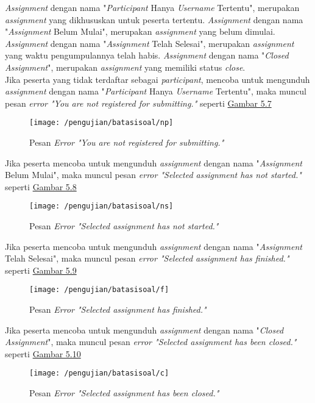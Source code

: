 	\textit{Assignment} dengan nama "\textit{Participant} Hanya \textit{Username} Tertentu", merupakan \textit{assignment} yang dikhususkan untuk peserta tertentu. \textit{Assignment} dengan nama "\textit{Assignment} Belum Mulai", merupakan \textit{assignment} yang belum dimulai. \textit{Assignment} dengan nama "\textit{Assignment} Telah Selesai", merupakan \textit{assignment} yang waktu pengumpulannya telah habis. \textit{Assignment} dengan nama "\textit{Closed Assignment}", merupakan \textit{assignment} yang memiliki status \textit{close}. \\
	
	Jika peserta yang tidak terdaftar sebagai \textit{participant}, mencoba untuk mengunduh \textit{assignment} dengan nama "\textit{Participant} Hanya \textit{Username} Tertentu", maka muncul pesan \textit{error "You are not registered for submitting."} seperti \hyperref[fig:np]{Gambar 5.7} 
	\begin{figure}[H]
		\centering  
		\texttt{[image: /pengujian/batasisoal/np]}  
		\caption[Pesan \textit{Error "You are not registered for submitting."}]{Pesan \textit{Error "You are not registered for submitting."}} 
		\label{fig:np} 
	\end{figure}

	Jika peserta mencoba untuk mengunduh \textit{assignment} dengan nama "\textit{Assignment} Belum Mulai", maka muncul pesan \textit{error "Selected assignment has not started."} seperti \hyperref[fig:ns]{Gambar 5.8} 
	\begin{figure}[H]
		\centering  
		\texttt{[image: /pengujian/batasisoal/ns]}  
		\caption[Pesan \textit{Error "Selected assignment has not started."}]{Pesan \textit{Error "Selected assignment has not started."}} 
		\label{fig:ns} 
	\end{figure}

	Jika peserta mencoba untuk mengunduh \textit{assignment} dengan nama "\textit{Assignment} Telah Selesai", maka muncul pesan \textit{error "Selected assignment has finished."} seperti \hyperref[fig:f]{Gambar 5.9} 
	\begin{figure}[H]
		\centering  
		\texttt{[image: /pengujian/batasisoal/f]}  
		\caption[Pesan\textit{ Error "Selected assignment has finished."}]{Pesan \textit{Error "Selected assignment has finished."}} 
		\label{fig:f} 
	\end{figure}

	Jika peserta mencoba untuk mengunduh \textit{assignment} dengan nama "\textit{Closed Assignment}", maka muncul pesan \textit{error "Selected assignment has been closed."} seperti \hyperref[fig:c]{Gambar 5.10} 
	\begin{figure}[H]
		\centering  
		\texttt{[image: /pengujian/batasisoal/c]}  
		\caption[Pesan \textit{Error "Selected assignment has been closed."}]{Pesan \textit{Error "Selected assignment has been closed."}} 
		\label{fig:c} 
	\end{figure}

